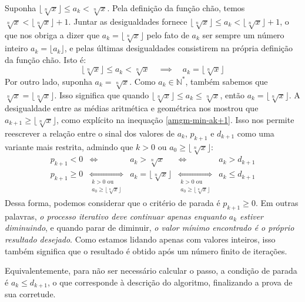 Suponha $\lfloor \sqrt[n]{x} \rfloor \le a_k < \sqrt[n]{x}$.
Pela definição da função chão, temos
$\sqrt[n]{x} < \lfloor\sqrt[n]{x}\rfloor + 1$.
Juntar as desigualdades fornece
$\lfloor\sqrt[n]{x}\rfloor \le a_k < \lfloor\sqrt[n]{x}\rfloor + 1$,
o que nos obriga a dizer que $a_k = \lfloor\sqrt[n]{x}\rfloor$
pelo fato de $a_k$ ser sempre um número inteiro
$a_k = \lfloor a_k \rfloor$,
e pelas últimas desigualdades consistirem
na própria definição da função chão.
Isto é:
\begin{equation}\label{ak-between-floor-and-root}
  \lfloor \sqrt[n]{x} \rfloor \le a_k < \sqrt[n]{x}
  \quad\implies\quad
  a_k = \lfloor \sqrt[n]{x} \rfloor
\end{equation}
Por outro lado, suponha $a_k = \sqrt[n]{x}$.
Como $a_k \in \mathds{N}^*$,
também sabemos que $\sqrt[n]{x} = \lfloor \sqrt[n]{x} \rfloor$.
Isso significa que
quando $\lfloor \sqrt[n]{x} \rfloor \le a_k \le \sqrt[n]{x}$,
então $a_k = \lfloor \sqrt[n]{x} \rfloor$.
A desigualdade entre as médias aritmética e geométrica
nos mostrou que $a_{k+1} \ge \lfloor \sqrt[n]{x} \rfloor$,
como explícito na inequação \eqref{amgm-min-ak+1}.
Isso nos permite reescrever
a relação entre o sinal dos valores de $a_k$, $p_{k+1}$ e $d_{k+1}$
como uma variante mais restrita,
admindo que $k > 0$ ou $a_0 \ge \lfloor \sqrt[n]{x} \rfloor$:
\begin{equation}
  \begin{array}{lcccr}
      p_{k+1} < 0
    &\iff&
      a_k > \sqrt[n]{x}
    &\iff&
      a_k > d_{k+1}
    \\
      p_{k+1} \ge 0
    &\underset{\substack{k > 0 \text{ ou} \\[.2em]
                         a_0 \ge \lfloor \sqrt[n]{x} \rfloor}}{\iff}&
      a_k = \lfloor \sqrt[n]{x} \rfloor
    &\underset{\substack{k > 0 \text{ ou} \\[.2em]
                         a_0 \ge \lfloor \sqrt[n]{x} \rfloor}}{\iff}&
      a_k \le d_{k+1}
  \end{array}
\end{equation}
Dessa forma,
podemos considerar que o critério de parada é $p_{k+1} \ge 0$.
Em outras palavras,
\emph{o processo iterativo deve continuar
      apenas enquanto $a_k$ estiver diminuindo},
e quando parar de diminuir,
\emph{o valor mínimo encontrado é o próprio resultado desejado}.
Como estamos lidando apenas com valores inteiros,
isso também significa que o resultado é obtido
após um número finito de iterações.

Equivalentemente, para não ser necessário calcular o passo,
a condição de parada é $a_k \le d_{k+1}$,
o que corresponde à descrição do algoritmo,
finalizando a prova de sua corretude.
